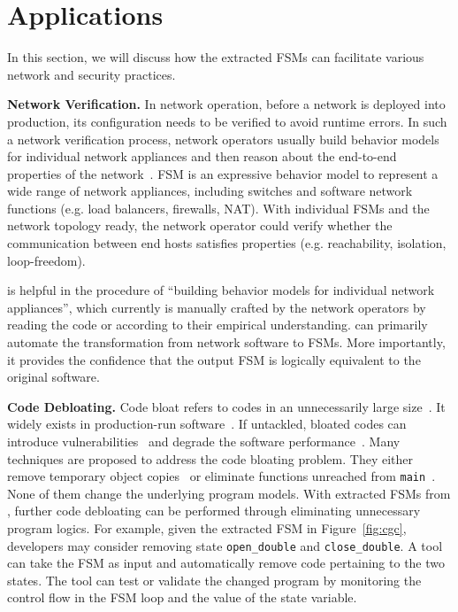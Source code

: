 
\section{Applications}
\label{sec:app}

In this section, we will discuss how the extracted FSMs can facilitate
various network and security practices.


\noindent\textbf{Network Verification.}  In network operation, before a network
is deployed into production, its configuration needs to be verified to avoid
runtime errors. In such a network verification process, network operators
usually build behavior models for individual network appliances and then
reason about the end-to-end properties of the
network~\cite{mai2011debugging,khurshid2013veriflow,kazemian2012header,kazemian2013real,fayaz2016buzz,panda2017verifying}.
FSM is an expressive
behavior model to represent a wide range of network appliances, including
switches and software network functions (e.g. load balancers, firewalls, NAT). 
With individual FSMs and the network topology ready, the network
operator could verify whether the communication between end hosts satisfies
properties (e.g. reachability, isolation, loop-freedom).%

\Tool{} is helpful in the procedure of ``building behavior models for
individual network appliances'', which currently is manually crafted by
the network operators by reading the code or according to their
empirical understanding. \Tool{} can primarily automate the
transformation from network software to FSMs. More importantly, it
provides the confidence that the output FSM is logically equivalent
to the original software.


\noindent\textbf{Code Debloating.}
Code bloat refers to codes in an unnecessarily large size~\cite{code-bloat}.
It widely exists in production-run software~\cite{code-bloat-study}.
If untackled, bloated codes can introduce vulnerabilities~\cite{protocol-mao} and 
degrade the software performance~\cite{BloatFSE2008,XuBloatPLDI2009,XuBloatPLDI2010}.
Many techniques are proposed to address the code bloating problem.
They either remove temporary object copies~\cite{BloatFSE2008,XuBloatPLDI2009,
XuBloatPLDI2010,Reusable,Cachetor}
or eliminate functions unreached from
\texttt{main}~\cite{container-debloating-1,
container-debloating-2, dinghao-1}.
None of them change the underlying program models.
With extracted FSMs from \Tool{},
further code debloating can be performed through
eliminating unnecessary program logics.
For example, given the extracted FSM in Figure~\ref{fig:cgc},
developers may consider removing state \texttt{open\_double} and
\texttt{close\_double}.
A tool can take the FSM as input and automatically
remove code pertaining to the two states.
The tool can test or validate the changed program
by monitoring the control flow
in the FSM loop and the value of the state variable.

